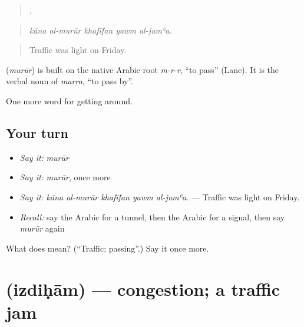 \begin{quote}
    .
\end{quote}

\begin{quote}
\emph{kāna al-murūr khafīfan yawm al-jumʿa.}
\end{quote}

\begin{quote}
Traffic was light on Friday.
\end{quote}

\begin{cousinweb}
\textbf{} (\emph{murūr}) is built on the native Arabic root \emph{m-r-r}, \textquotedblleft{}to pass\textquotedblright{} (Lane). It is the verbal noun of \emph{marra}, \textquotedblleft{}to pass by\textquotedblright{}.
\end{cousinweb}

\begin{grammarlens}[title={What you've built}]
One more word for getting around.
\end{grammarlens}

\subsection*{Your turn}
\begin{itemize}
\raggedright
  \item \emph{Say it:} \emph{murūr}
  \item \emph{Say it:} \emph{murūr}, once more
  \item \emph{Say it:} \emph{kāna al-murūr khafīfan yawm al-jumʿa.} — Traffic was light on Friday.
  \item \emph{Recall:} say the Arabic for a tunnel, then the Arabic for a signal, then say \emph{murūr} again
\end{itemize}

\begin{tcolorbox}[breakable,colback=teal!4,colframe=teal!35!black,title={Before you move on}]
What does  mean? (\textquotedblleft{}Traffic; passing\textquotedblright{}.) Say it once more.
\end{tcolorbox}
\section[\texorpdfstring{\ar{ازدحام} (izdiḥām)}{ازدحام (izdiḥām)}]{ (izdiḥām) — congestion; a traffic jam}

\label{lesson:AR-C431-izdiham}



